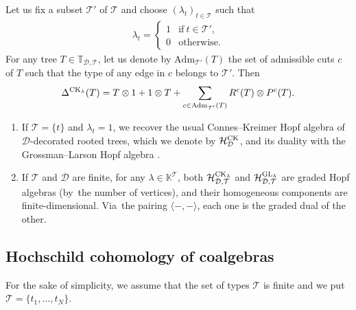 \documentclass[pdftex]{sigma}
\numberwithin{equation}{section}
\newcommand{\K}{\mathbb{K}}
\newcommand{\T}{\mathcal{T}}
\newcommand{\D}{\mathcal{D}}
\newcommand{\adm}{\mathrm{Adm}}
\newcommand{\h}{\mathcal{H}}
\newcommand{\bfT}{\mathbb{T}}
\begin{document}
\begin{Example}
Let us fix a subset $\T'$ of $\T$ and choose $(\lambda_t)_{t\in \T}$ such that
\begin{gather*}
\lambda_t=\begin{cases}
1&\mbox{if} \ t\in \T',
\\
0&\mbox{otherwise}.
\end{cases}\end{gather*}
For any tree $T\in \bfT_{\D,\T}$, let us denote by $\adm_{\T'}(T)$ the set of admissible cuts $c$ of $T$ such that
the type of any edge in $c$ belongs to $\T'$. Then
\begin{gather*}
\Delta^{{\rm CK}_\lambda}(T)=T\otimes 1+1\otimes T+\sum_{c\in \adm_{\T'}(T)} R^c(T)\otimes P^c(T).
\end{gather*}
\end{Example}

\begin{Remark}\quad \begin{enumerate}\itemsep=0pt
\item If $\T=\{t\}$ and $\lambda_t=1$, we recover the usual Connes--Kreimer Hopf algebra of $\D$-decorated rooted trees,
which we denote by $\h_{\D}^{{\rm CK}}$, and its duality with the Grossman--Larson Hopf algebra
\cite{ConnesKreimer,Hoffman,Panaite}.
\item If $\T$ and $\D$ are finite, for any $\lambda\in \K^\T$, both $\h_{\D,\T}^{{\rm CK}_\lambda}$ and $\h_{\D,\T}^{{\rm GL}_\lambda}$
are graded Hopf algebras (by~the number of vertices),
and their homogeneous components are finite-dimensional.
Via~the pairing $\langle-,-\rangle$, each one is the graded dual of the other.
\end{enumerate}
\end{Remark}

\subsection{Hochschild cohomology of coalgebras}

For the sake of simplicity, we assume that the set of types $\T$ is finite
and we put $\T=\{t_1,\dots,t_N\}$.
\end{document}
